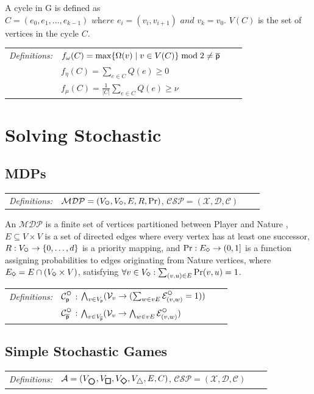 \documentclass[12pt]{extarticle}
\newcommand{\definition}[1] {
    \begin{tcolorbox}[colback=mygray,colframe=mygray,sharp corners=all,top=0.01cm,bottom=0.01cm,left=0.1cm]
    \small
    \setlength{\tabcolsep}{2pt}
    \begin{tabular}{l l l l}
        \textit{Definitions:} & #1
    \end{tabular}
    \end{tcolorbox}
}
\begin{document}
A cycle in G is defined as $C = (e_0, e_1, \dots, e_{k-1}) \textit{ where } e_i = (v_i, v_{i+1}) \textit{ and } v_k = v_0$.  $V(C)$ is the set of vertices in the cycle $C$.

\definition{
    $f_\omega(C) = \max\{\Omega(v) \mid v \in V(C)\} \bmod 2 \ne \overline{\mathsf{p}}$
    \\ & $f_\eta(C) = \sum_{e \in C} Q(e) \ge 0$
    \\ & $f_\mu(C) = \frac{1}{|C|} \sum_{e \in C} Q(e) \ge \nu$}



\section{Solving Stochastic \wregulargames}

\subsection{MDPs}

\definition{
    $\mathcal{MDP} = (
        V_{\subeven}, V_{\subnature}, E, R,\Pr)$, $\mathcal{CSP} = (\mathcal{X}, \mathcal{D}, \mathcal{C})$
}

An $\mathcal{MDP}$ is a finite set of vertices partitioned between Player \even and Nature \nature, $E \subseteq V \times V$ is a set of directed edges where every vertex has at least one successor, $R: V_{\subeven} \to \{0, \dots, d\}$ is a priority mapping, and $\Pr: E_{\subnature} \to (0, 1]$ is a function assigning probabilities to edges originating from Nature vertices, where $E_{\subnature} = E \cap (V_{\subnature} \times V)$, satisfying $\forall v \in V_{\subnature}: \sum_{(v, u) \in E} \Pr(v, u) = 1$.

\definition{
    $\mathcal{C}^{\subeven}_{\player}$ : $\bigwedge_{v \in V_{\player}} (\mathcal{V}_v \rightarrow (\sum_{w \in vE} \mathcal{E}^{\subeven}_{(v,w)}= 1))$

    \\ & $\mathcal{C}^{\subeven}_{\opponent}$ : $\bigwedge_{v \in V_{\opponent}} (\mathcal{V}_v \rightarrow \bigwedge_{w \in vE} \mathcal{E}^{\subeven}_{(v,w)})$}

\subsection{Simple Stochastic Games}

\definition{
    $\mathcal{A} = (
        V_{\mini}, V_{\maxi}, V_{\rand}, V_{\sink}, E, C)$, $\mathcal{CSP} = (\mathcal{X}, \mathcal{D}, \mathcal{C})$
}
\end{document}
